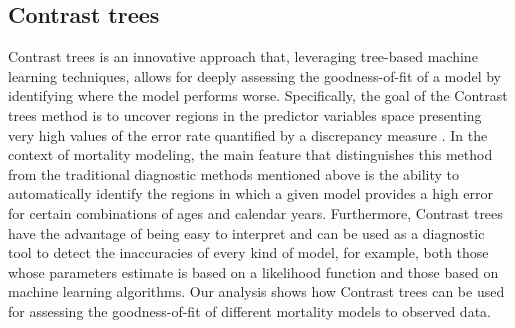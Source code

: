 \documentclass[a4,11pt]{article}
\begin{document}
\subsection{Contrast trees}
Contrast trees is an innovative approach that, leveraging tree-based machine learning techniques, allows for deeply assessing the goodness-of-fit of a model by identifying where the model performs worse. 
Specifically, the goal of the Contrast trees method is to uncover regions in the predictor variables space presenting very high values of the error rate quantified by a discrepancy measure \cite{Friedman2020}. In the context of mortality modeling, the main feature that distinguishes this method from the traditional diagnostic methods mentioned above is the ability to automatically identify the regions in which a given model provides a high error for certain combinations of ages and calendar years.
Furthermore, Contrast trees have the advantage of being easy to interpret and can be used as a diagnostic tool to detect the inaccuracies of every kind of model, for example, both those whose parameters estimate is based on a likelihood function and those based on machine learning algorithms. Our analysis shows how Contrast trees can be used for assessing the goodness-of-fit of different mortality models to observed data. 
\end{document}

